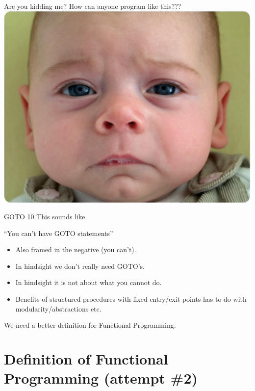 \documentclass{beamer}
\begin{document}
\begin{frame}{Are you kidding me?}
  How can anyone program like this???
  \includegraphics[scale=0.3]{img/sadbaby.png}
\end{frame}

\begin{frame}{GOTO 10}
    This sounds like
  \begin{exampleblock}{}
    {\Large ``You can't have GOTO statements''}
  \end{exampleblock}
  \vskip5mm
  \hspace*{}

  \begin{itemize}[<+->]
  \item Also framed in the negative (you can't).
  \item In hindsight we don't really need GOTO's.
  \item In hindsight it is not about what you cannot do.
  \item Benefits of structured procedures with fixed entry/exit points
    has to do with modularity/abstractions etc.
  \end{itemize}
\end{frame}

\begin{frame}{}
  {\Large We need a better definition for Functional Programming.}
\end{frame}

\section{Definition of Functional Programming (attempt \#2)}
\end{document}
